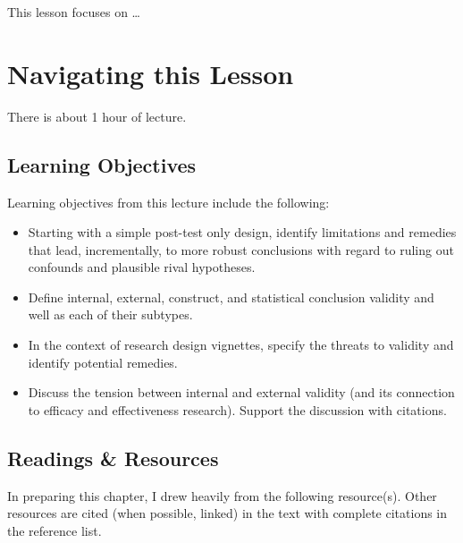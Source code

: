 \documentclass[
  english,
]{book}
\providecommand{\tightlist}{%
  \setlength{\itemsep}{0pt}\setlength{\parskip}{0pt}}
\begin{document}
This lesson focuses on \ldots{}

\hypertarget{navigating-this-lesson-2}{%
\section{Navigating this Lesson}\label{navigating-this-lesson-2}}

There is about 1 hour of lecture.

\hypertarget{learning-objectives-2}{%
\subsection{Learning Objectives}\label{learning-objectives-2}}

Learning objectives from this lecture include the following:

\begin{itemize}
\tightlist
\item
  Starting with a simple post-test only design, identify limitations and remedies that lead, incrementally, to more robust conclusions with regard to ruling out confounds and plausible rival hypotheses.
\item
  Define internal, external, construct, and statistical conclusion validity and well as each of their subtypes.
\item
  In the context of research design vignettes, specify the threats to validity and identify potential remedies.\\
\item
  Discuss the tension between internal and external validity (and its connection to efficacy and effectiveness research). Support the discussion with citations.
\end{itemize}

\hypertarget{readings-resources-2}{%
\subsection{Readings \& Resources}\label{readings-resources-2}}

In preparing this chapter, I drew heavily from the following resource(s). Other resources are cited (when possible, linked) in the text with complete citations in the reference list.
\end{document}
